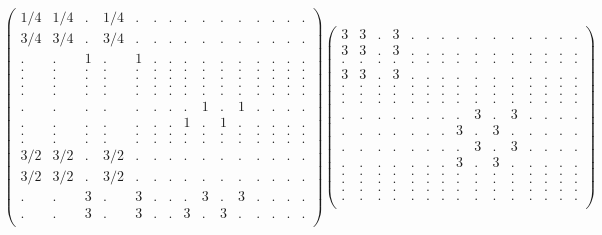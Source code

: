 \documentclass[12pt,a4paper]{amsart}
\begin{document}
\begin{align*}
\left(\begin{array}{rrrrrrrrrrrrrrr}%
1/4&1/4&.&1/4&.&.&.&.&.&.&.&.&.&.&.\\%
3/4&3/4&.&3/4&.&.&.&.&.&.&.&.&.&.&.\\%
.&.&1&.&1&.&.&.&.&.&.&.&.&.&.\\%
.&.&.&.&.&.&.&.&.&.&.&.&.&.&.\\%
.&.&.&.&.&.&.&.&.&.&.&.&.&.&.\\%
.&.&.&.&.&.&.&.&.&.&.&.&.&.&.\\%
.&.&.&.&.&.&.&.&.&.&.&.&.&.&.\\%
.&.&.&.&.&.&.&.&1&.&1&.&.&.&.\\%
.&.&.&.&.&.&.&1&.&1&.&.&.&.&.\\%
.&.&.&.&.&.&.&.&.&.&.&.&.&.&.\\%
.&.&.&.&.&.&.&.&.&.&.&.&.&.&.\\%
3/2&3/2&.&3/2&.&.&.&.&.&.&.&.&.&.&.\\%
3/2&3/2&.&3/2&.&.&.&.&.&.&.&.&.&.&.\\%
.&.&3&.&3&.&.&.&3&.&3&.&.&.&.\\%
.&.&3&.&3&.&.&3&.&3&.&.&.&.&.\\%
\end{array}\right)%
\left(\begin{array}{rrrrrrrrrrrrrrr}%
3&3&.&3&.&.&.&.&.&.&.&.&.&.&.\\%
3&3&.&3&.&.&.&.&.&.&.&.&.&.&.\\%
.&.&.&.&.&.&.&.&.&.&.&.&.&.&.\\%
3&3&.&3&.&.&.&.&.&.&.&.&.&.&.\\%
.&.&.&.&.&.&.&.&.&.&.&.&.&.&.\\%
.&.&.&.&.&.&.&.&.&.&.&.&.&.&.\\%
.&.&.&.&.&.&.&.&.&.&.&.&.&.&.\\%
.&.&.&.&.&.&.&.&3&.&3&.&.&.&.\\%
.&.&.&.&.&.&.&3&.&3&.&.&.&.&.\\%
.&.&.&.&.&.&.&.&3&.&3&.&.&.&.\\%
.&.&.&.&.&.&.&3&.&3&.&.&.&.&.\\%
.&.&.&.&.&.&.&.&.&.&.&.&.&.&.\\%
.&.&.&.&.&.&.&.&.&.&.&.&.&.&.\\%
.&.&.&.&.&.&.&.&.&.&.&.&.&.&.\\%
.&.&.&.&.&.&.&.&.&.&.&.&.&.&.\\%
\end{array}\right)%
\end{align*}
\end{document}
